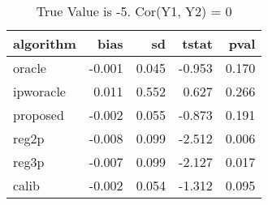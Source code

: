 \begin{table}[h!]

\caption{True Value is -5. Cor(Y1, Y2) = 0}
\centering
\begin{tabular}[t]{lrrrr}
\toprule
algorithm & bias & sd & tstat & pval\\
\midrule
oracle & -0.001 & 0.045 & -0.953 & 0.170\\
ipworacle & 0.011 & 0.552 & 0.627 & 0.266\\
proposed & -0.002 & 0.055 & -0.873 & 0.191\\
reg2p & -0.008 & 0.099 & -2.512 & 0.006\\
reg3p & -0.007 & 0.099 & -2.127 & 0.017\\
\addlinespace
calib & -0.002 & 0.054 & -1.312 & 0.095\\
\bottomrule
\end{tabular}
\end{table}
